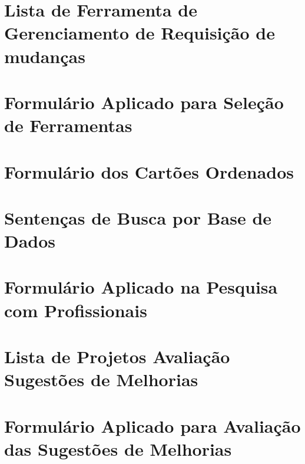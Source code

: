 \begin{appendices}

\chapter{Lista de Ferramenta de Gerenciamento de Requisição de mudanças}
\label{ch:app-lista-fgrm}


\chapter{Formulário Aplicado para Seleção de Ferramentas}
\label{ch:app-form-selecao-ferramentas}


\chapter{Formulário dos Cartões Ordenados}
\label{ch:app-form-cartoes-ordenados}


\chapter{Sentenças de Busca por Base de Dados}
\label{ch:app-setenca-de-busca-base-dados}


\chapter{Formulário Aplicado na Pesquisa com Profissionais}
\label{ch:app-form-pesq-profissionais}


\chapter{Lista de Projetos Avaliação Sugestões de Melhorias}
\label{ch:app-tb-lista-projetos-sug-melhorias}


\chapter{Formulário Aplicado para Avaliação das Sugestões de Melhorias}
\label{ch:app-form-sug-melhorias}


\end{appendices}